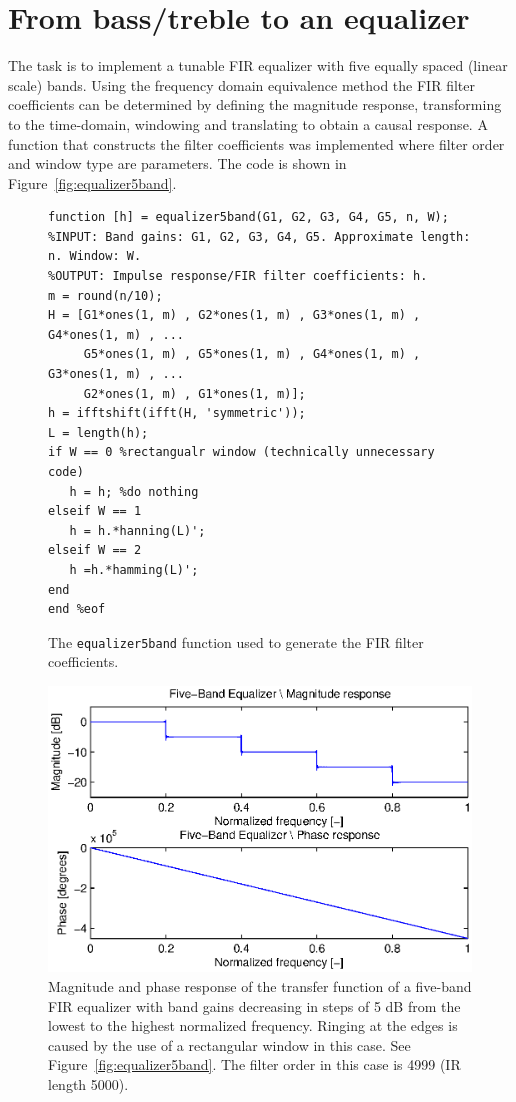 \section{\large From bass/treble to an equalizer}
The task is to implement a tunable FIR equalizer with five equally spaced (linear scale) bands.
Using the frequency domain equivalence method the FIR filter coefficients can be determined by defining the magnitude response, transforming to the time-domain, windowing and translating to obtain a causal response. A function that constructs the filter coefficients was implemented where filter order and window type are parameters. The code is shown in Figure~\ref{fig:equalizer5band}.
\begin{figure}[H]
\center
\begin{lstlisting}
function [h] = equalizer5band(G1, G2, G3, G4, G5, n, W);
%INPUT: Band gains: G1, G2, G3, G4, G5. Approximate length: n. Window: W.
%OUTPUT: Impulse response/FIR filter coefficients: h.
m = round(n/10);
H = [G1*ones(1, m) , G2*ones(1, m) , G3*ones(1, m) , G4*ones(1, m) , ...
     G5*ones(1, m) , G5*ones(1, m) , G4*ones(1, m) , G3*ones(1, m) , ...
     G2*ones(1, m) , G1*ones(1, m)];
h = ifftshift(ifft(H, 'symmetric'));
L = length(h);
if W == 0 %rectangualr window (technically unnecessary code)
   h = h; %do nothing
elseif W == 1
   h = h.*hanning(L)';
elseif W == 2
   h =h.*hamming(L)'; 
end
end %eof
\end{lstlisting}
\caption{The \texttt{equalizer5band} function used to generate the FIR filter coefficients.}
\label{fig:equalizer5band}
\includegraphics[scale=1]{./picture/FiveBandEqualizer.eps}%
\caption{Magnitude and phase response of the transfer function of a five-band FIR equalizer with band gains decreasing in steps of 5 dB from the lowest to the highest normalized frequency. Ringing at the edges is caused by the use of a rectangular window in this case. See Figure~\ref{fig:equalizer5band}. The filter order in this case is 4999 (IR length 5000).}
\label{fig:FiveBandEqualizer}
\end{figure}

